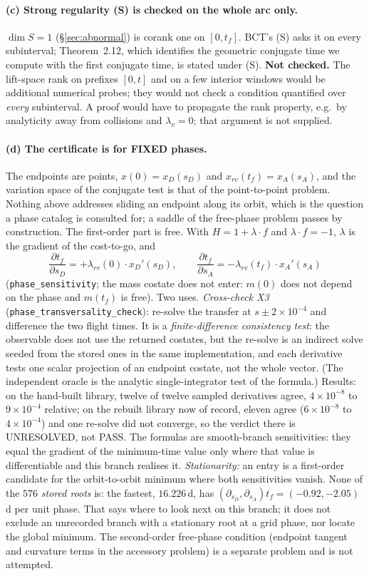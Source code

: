 \documentclass[11pt]{article}
\theoremstyle{definition}
\newcommand{\lv}{\lambda_v}
\newcommand{\tf}{t_f}
\begin{document}
\paragraph{(c) Strong regularity (S) is checked on the whole arc only.}
$\dim S=1$ (\S\ref{sec:abnormal}) is corank one on $[0,\tf]$. BCT's (S) asks
it on every subinterval; Theorem~2.12, which identifies the geometric
conjugate time we compute with the first conjugate time, is stated under (S).
\textbf{Not checked.} The lift-space rank on prefixes $[0,t]$ and on a few
interior windows would be additional numerical probes; they would not check a
condition quantified over \emph{every} subinterval. A proof would have to
propagate the rank property, e.g.\ by analyticity away from collisions and
$\lv=0$; that argument is not supplied.

\paragraph{(d) The certificate is for FIXED phases.}
The endpoints are points, $x(0)=x_D(s_D)$ and $x_{rv}(\tf)=x_A(s_A)$, and the
variation space of the conjugate test is that of the point-to-point problem.
Nothing above addresses sliding an endpoint along its orbit, which is the
question a phase catalog is consulted for; a saddle of the free-phase problem
passes by construction. The first-order part is free. With
$H=1+\lambda\!\cdot\!f$ and $\lambda\!\cdot\!f=-1$, $\lambda$ is the gradient
of the cost-to-go, and
\[
 \frac{\partial\tf}{\partial s_D}=+\lambda_{rv}(0)\cdot x_D'(s_D),\qquad
 \frac{\partial\tf}{\partial s_A}=-\lambda_{rv}(\tf)\cdot x_A'(s_A)
\]
(\texttt{phase\_sensitivity}; the mass costate does not enter: $m(0)$ does not
depend on the phase and $m(\tf)$ is free). Two uses.
\emph{Cross-check X3} (\texttt{phase\_transversality\_check}): re-solve the
transfer at $s\pm2\times10^{-4}$ and difference the two flight times. It is a
\emph{finite-difference consistency test}: the observable does not use the
returned costates, but the re-solve is an indirect solve seeded from the stored
ones in the same implementation, and each derivative tests one scalar
projection of an endpoint costate, not the whole vector. (The independent
oracle is the analytic single-integrator test of the formula.) Results: on the
hand-built library, twelve of twelve sampled derivatives agree, $4\times10^{-8}$
to $9\times10^{-4}$ relative; on the rebuilt library now of record, eleven
agree ($6\times10^{-8}$ to $4\times10^{-4}$) and one re-solve did not
converge, so the verdict there is UNRESOLVED, not PASS. The formulas are
smooth-branch sensitivities: they equal the gradient of the minimum-time value
only where that value is differentiable and this branch realises it.
\emph{Stationarity:} an entry is a first-order candidate for the
orbit-to-orbit minimum where both sensitivities vanish. None of the $576$
\emph{stored roots} is: the fastest, $16.226$\,d, has
$(\partial_{s_D},\partial_{s_A})\tf=(-0.92,-2.05)$ d per unit phase. That says
where to look next on this branch; it does not exclude an unrecorded branch
with a stationary root at a grid phase, nor locate the global minimum. The
second-order free-phase condition (endpoint tangent and curvature terms in the
accessory problem) is a separate problem and is not attempted.
\end{document}
